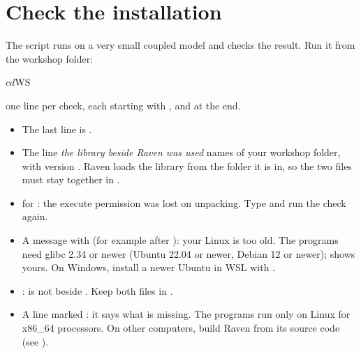 \section{Check the installation}

The script  runs  on a very small coupled model and checks the result.
Run it from the workshop folder:
\begin{shell}
$ cd $WS
\end{shell}
\see one line per check, each starting with , and  at the end.
\begin{tocheck}
\begin{itemize}
\item The last line is .
\item The line \emph{the library beside Raven was used} names  of your workshop folder, with version
  . Raven loads the library from the folder it is in, so the two files must stay together in .
\end{itemize}
\end{tocheck}
\begin{trouble}
\begin{itemize}
\item {} for : the execute permission was lost on unpacking. Type
   and run the check again.
\item A message with  (for example after ): your Linux is too old. The programs need glibc 2.34 or newer (Ubuntu 22.04 or newer, Debian 12 or newer);  shows yours. On Windows, install a newer Ubuntu in WSL with .
\item {}:  is not beside . Keep both files in .
\item A line marked : it says what is missing. The programs run only on Linux for x86\_64 processors. On other
  computers, build Raven from its source code (see ).
\end{itemize}
\end{trouble}
